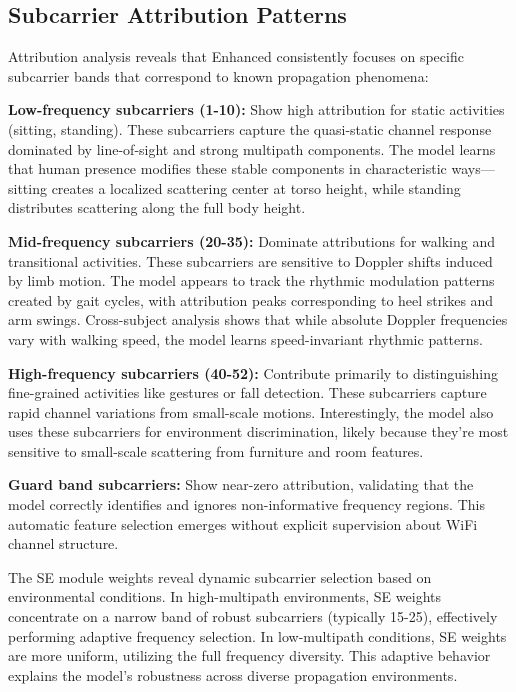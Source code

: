 \documentclass[journal]{IEEEtran}
\begin{document}
\subsection{Subcarrier Attribution Patterns}
Attribution analysis reveals that Enhanced consistently focuses on specific subcarrier bands that correspond to known propagation phenomena:

\textbf{Low-frequency subcarriers (1-10):} Show high attribution for static activities (sitting, standing). These subcarriers capture the quasi-static channel response dominated by line-of-sight and strong multipath components. The model learns that human presence modifies these stable components in characteristic ways—sitting creates a localized scattering center at torso height, while standing distributes scattering along the full body height.

\textbf{Mid-frequency subcarriers (20-35):} Dominate attributions for walking and transitional activities. These subcarriers are sensitive to Doppler shifts induced by limb motion. The model appears to track the rhythmic modulation patterns created by gait cycles, with attribution peaks corresponding to heel strikes and arm swings. Cross-subject analysis shows that while absolute Doppler frequencies vary with walking speed, the model learns speed-invariant rhythmic patterns.

\textbf{High-frequency subcarriers (40-52):} Contribute primarily to distinguishing fine-grained activities like gestures or fall detection. These subcarriers capture rapid channel variations from small-scale motions. Interestingly, the model also uses these subcarriers for environment discrimination, likely because they're most sensitive to small-scale scattering from furniture and room features.

\textbf{Guard band subcarriers:} Show near-zero attribution, validating that the model correctly identifies and ignores non-informative frequency regions. This automatic feature selection emerges without explicit supervision about WiFi channel structure.

The SE module weights reveal dynamic subcarrier selection based on environmental conditions. In high-multipath environments, SE weights concentrate on a narrow band of robust subcarriers (typically 15-25), effectively performing adaptive frequency selection. In low-multipath conditions, SE weights are more uniform, utilizing the full frequency diversity. This adaptive behavior explains the model's robustness across diverse propagation environments.
\end{document}
